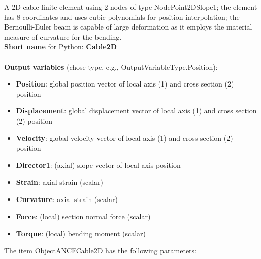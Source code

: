 A 2D cable finite element using 2 nodes of type NodePoint2DSlope1; the element has 8 coordinates and uses cubic polynomials for position interpolation; the Bernoulli-Euler beam is capable of large deformation as it employs the material measure of curvature for the bending.
 \\
{\bf Short name} for Python: {\bf Cable2D}
 \\\\ 
{\bf Output variables} (chose type, e.g., OutputVariableType.Position): 
\begin{itemize}
    \item {\bf Position}: global position vector of local axis (1) and cross section (2) position
    \item {\bf Displacement}: global displacement vector of local axis (1) and cross section (2) position
    \item {\bf Velocity}: global velocity vector of local axis (1) and cross section (2) position
    \item {\bf Director1}: (axial) slope vector of local axis position
    \item {\bf Strain}: axial strain (scalar)
    \item {\bf Curvature}: axial strain (scalar)
    \item {\bf Force}: (local) section normal force (scalar)
    \item {\bf Torque}: (local) bending moment (scalar)
\end{itemize}
The item ObjectANCFCable2D has the following parameters:
